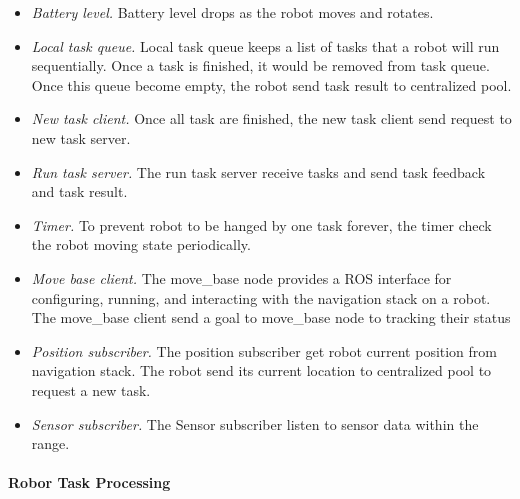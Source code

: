 \begin{itemize}
	\item \textsl{Battery level.} Battery level drops as the robot moves and rotates.
	\item \textsl{Local task queue.} Local task queue keeps a list of tasks that a robot will run sequentially. Once a task is finished, it would be removed from task queue. Once this queue become empty, the robot send task result to centralized pool.
	\item \textsl{New task client.} Once all task are finished, the new task client send request to new task server.
	\item \textsl{Run task server.} The run task server receive tasks and send task feedback and task result.
	\item \textsl{Timer.} To prevent robot to be hanged by one task forever, the timer check the robot moving state periodically.
	\item \textsl{Move base client.} The move\_base node provides a ROS interface for configuring, running, and interacting with the navigation stack on a robot. The move\_base client send a goal to move\_base node to tracking their status  
	\item \textsl{Position subscriber.} The position subscriber get robot current position from navigation stack. The robot send its current location to centralized pool to request a new task.
	\item \textsl{Sensor subscriber.} The Sensor subscriber listen to sensor data within the range.
\end{itemize}

\paragraph{Robor Task Processing}

